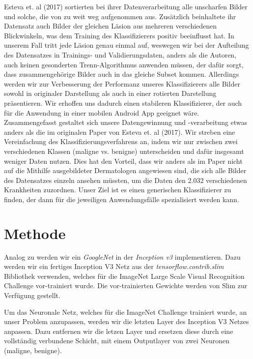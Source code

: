 \documentclass[%
   10pt,              %
   a4paper,           %
   DIV10,             %
]{scrartcl}%
\begin{document}
\noindent Esteva et. al (2017) \cite{skincancer} sortierten bei ihrer Datenverarbeitung alle unscharfen Bilder und solche, die von zu weit weg aufgenommen aus. Zusätzlich beinhaltete ihr Datensatz auch Bilder der gleichen Läsion aus mehreren verschiedenen Blickwinkeln, was dem Training des Klassifizierers positiv beeinflusst hat. In unserem Fall tritt jede Läsion genau einmal auf, weswegen wir bei der Aufteilung des Datensatzes in Trainings- und Validierungsdaten, anders als die Autoren, auch keinen gesonderten Trenn-Algorithmus anwenden müssen, der dafür sorgt, dass zusammengehörige Bilder auch in das gleiche Subset kommen. Allerdings werden wir zur Verbesserung der Performanz unseres Klassifizierers alle Bilder sowohl in originaler Darstellung als auch in einer rotierten Darstellung präsentieren. Wir erhoffen uns dadurch einen stabileren Klassifizierer, der auch für die Anwendung in einer mobilen Android App geeignet wäre.\\
\noindent Zusammengefasst gestaltet sich unsere Datengewinnung und -verarbeitung etwas anders als die im originalen Paper von Esteva et. al (2017). Wir streben eine Vereinfachung des Klassifizierungsverfahrens an, indem wir nur zwischen zwei verschiedenen Klassen (maligne vs. benigne) unterscheiden und dafür insgesamt weniger Daten nutzen. Dies hat den Vorteil, dass wir anders als im Paper nicht auf die Mithilfe ausgebildeter Dermatologen angewiesen sind, die sich alle Bilder des Datensatzes einzeln ansehen müssten, um die Daten den 2.032 verschiedenen Krankheiten zuzordnen. Unser Ziel ist es einen generischen Klassifizierer zu finden, der dann für die jeweiligen Anwendungsfälle spezialisiert werden kann.   



\section*{Methode}

Analog zu \cite{skincancer} werden wir ein \textit{GoogleNet} in der \textit{Inception v3} \cite{inception} implementieren. Dazu werden wir ein fertiges Inception V3 Netz aus der \textit{tensorflow.contrib.slim} Bibliothek verwenden, welches für die ImageNet Large Scale Visual Recognition Challenge \cite{ILSVRC15} vor-trainiert wurde. Die vor-trainierten Gewichte werden von Slim zur Verfügung gestellt. 

\noindent Um das Neuronale Netz, welches für die ImageNet Challenge trainiert wurde, an unser Problem anzupassen, werden wir die letzten Layer des Inception V3 Netzes anpassen. Dazu entfernen wir die letzen Layer und ersetzen diese durch eine vollständig verbundene Schicht, mit einem Outputlayer von zwei Neuronen (maligne, benigne). 
\end{document}

